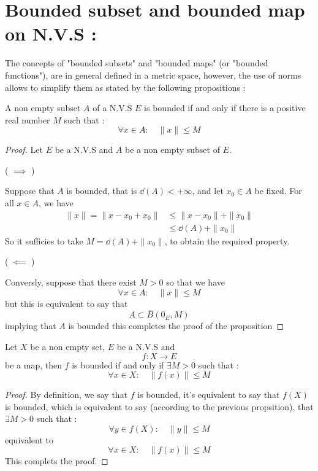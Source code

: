 \section{Bounded subset and bounded map on N.V.S : } 
The concepts of "bounded subsets" and "bounded maps" (or "bounded functions"), 
are in general defined in a metric space, however, the use of norms allows to
simplify them as stated by the following propositions : 
\begin{theorem}[]
A non empty subset $A$ of a N.V.S $E$ is bounded if and only if 
there is a positive real number $M$ such that : 
\[
\forall x \in A : \quad \| x \| \leq M
\]
\end{theorem}
\begin{proof}
	Let $E$ be a N.V.S and $A$ be a non empty subset of $E$. 
	\begin{center}
		(\textbf{ $ \implies $ })
	\end{center}
	Suppose that $A$ is bounded, that is $\dd \left( A \right) < +\infty $, 
	and let $x_0 \in  A$ be fixed. For all $x \in A$, we have 
	\begin{align*}
		\| x \| = \| x-x_0 + x_0 \|  & \leq 
		\| x-x_0 \| + \| x_0 \|  \\
					     & \leq 
					     \dd \left( A \right) + 
					     \| x_0 \| 
	\end{align*}
	So it sufficies to take $M = \dd \left( A \right) + \| x_0 \| $, to obtain
	the required property.
	\begin{center}
		(\textbf{ $ \impliedby $ })
	\end{center}
	Conversly, suppose that there exist $M > 0$ so that we have 
	\[
	\forall  x \in A : \quad \| x \| \leq M
	\]
	but this is equivalent to say that 
	\[
	A \subset \overline{B} \left( 0_{E}, M \right)
	\]
	implying that $A$ is bounded this completes the proof of the proposition
\end{proof}
\begin{theorem}[]
Let $X$ be a non empty set, $E$ be a N.V.S and 
\[
 f : X \longrightarrow E 
\]
be a map, then $f$ is bounded if and only if $\exists M > 0$ such that :
\[
\forall x \in X : \quad 
\| f(x)  \|  \leq M
\]
\end{theorem}
\begin{proof}
By definition, we say that $f$ is bounded, it's equivalent to say that 
$f \left( X \right)$ is bounded, which is equivalent to say (according
to the previous propsition), that $\exists M > 0$ such that : 
\[
\forall  y \in  f(X) : \quad 
\| y \|  \leq M
\]
equivalent to 
\[
\forall x \in  X : \quad 
\| f(x)  \|  \leq M
\]
This complets the proof.
\end{proof}
